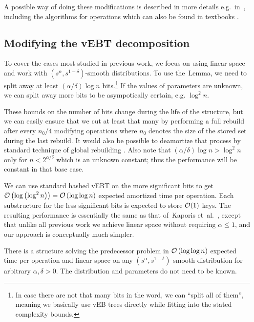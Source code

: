 A possible way of doing these modifications is described in more details
e.g.~in~\cite[chapter 4]{Cunat10}, including the algorithms for
operations which can also be found in textbooks \cite[chapter 20]{intro2alg}.

\subsection{Modifying the vEBT decomposition}

To cover the cases most studied in previous work, we focus on using
linear space and work with $\left(s^{\alpha},s^{1-\delta}\right)$-smooth
distributions. To use the~Lemma, we need to split away at least
$(\alpha/\delta)\log n$ bits.\footnote{In case there are not that many bits in the word, we can ``split
all of them'', meaning we basically use vEB trees directly while
fitting into the stated complexity bounds.} If the values of parameters are unknown, we can split away more bits
to be asympotically certain, e.g. $\log^{2}n$.

These bounds on the number of bits change during the life of the structure,
but we can easily ensure that we cut at least that many by performing
a full rebuild after every $n_{0}/4$ modifying operations where $n_{0}$
denotes the size of the stored set during the last rebuild. It would
also be possible to deamortize that process by standard technique
of global rebuilding \cite{global-rebuilding}. Also note that $\left(\alpha/\delta\right)\log n>\log^{2}n$
only for $n<2^{\alpha/\delta}$ which is an unknown constant; thus
the performance will be constant in that base case.

We can use standard hashed vEBT on the more significant bits to get
$\mathcal O\left(\log\left(\log^{2}n\right)\right)=\mathcal O\left(\log\log n\right)$
expected amortized time per operation. Each substructure for the less
significant bits is expected to store $\mathcal O(1)$ keys. The resulting
performance is essentially the same as that of~Kaporis et~al.~\cite{KMSTTZ06},
except that unlike all previous work we achieve linear space without
requiring $\alpha\le1$, and our approach is conceptually much simpler.
\begin{thm*}
There is a structure solving the predecessor problem in $\mathcal O\left(\log\log n\right)$
expected time per operation and linear space on any $\left(s^{\alpha},s^{1-\delta}\right)$-smooth
distribution for arbitrary $\alpha,\delta>0$. The distribution and
parameters do not need to be known.
\end{thm*}

